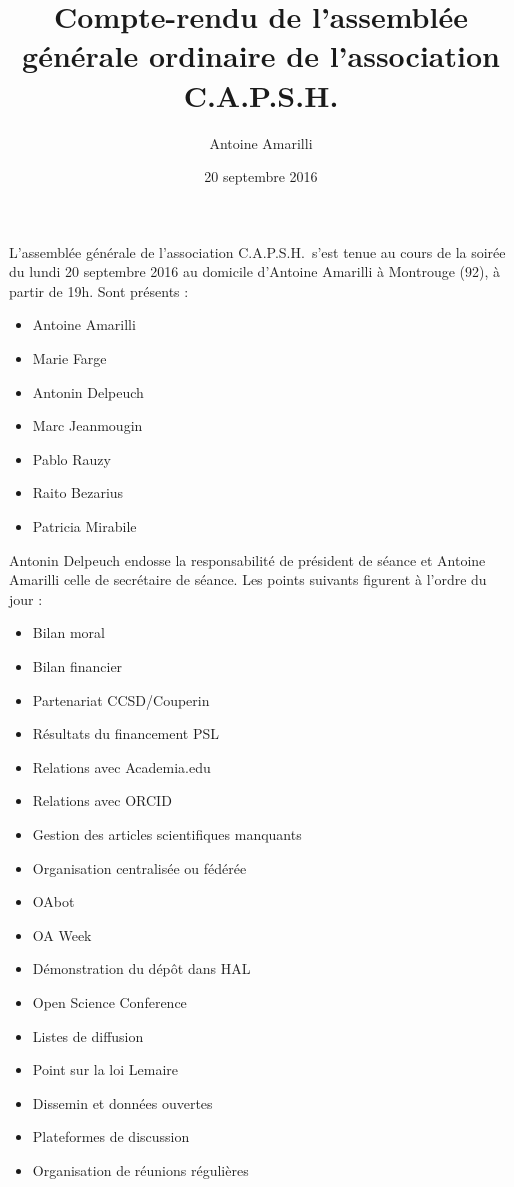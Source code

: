 \documentclass{scrartcl}
\title{Compte-rendu de l'assemblée générale ordinaire de l'association C.A.P.S.H.}
\author{Antoine Amarilli}
\date{20 septembre 2016}
\begin{document}
\maketitle

L'assemblée générale de l'association C.A.P.S.H.\ s'est tenue au cours de la
soirée du lundi 20 septembre 2016 au domicile d'Antoine Amarilli à Montrouge
(92), à partir de 19h.
% 
Sont présents :

\medskip

\begin{itemize}
\item Antoine Amarilli
\item Marie Farge
\item Antonin Delpeuch
\item Marc Jeanmougin
\item Pablo Rauzy
\item Raito Bezarius
\item Patricia Mirabile
\end{itemize}

\medskip

Antonin Delpeuch endosse la responsabilité de président de séance et Antoine
Amarilli celle de secrétaire de séance. Les points suivants figurent à l'ordre
du jour :

\medskip

\begin{itemize}
\item Bilan moral
\item Bilan financier
\item Partenariat CCSD/Couperin
\item Résultats du financement PSL
\item Relations avec Academia.edu
\item Relations avec ORCID
\item Gestion des articles scientifiques manquants
\item Organisation centralisée ou fédérée
\item OAbot
\item OA Week
\item Démonstration du dépôt dans HAL
\item Open Science Conference
\item Listes de diffusion
\item Point sur la loi Lemaire
\item Dissemin et données ouvertes
\item Plateformes de discussion
\item Organisation de réunions régulières
\end{itemize}
\end{document}
